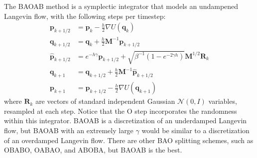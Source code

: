 \documentclass{article}
\begin{document}
      The BAOAB method is a symplectic integrator that models an undampened Langevin flow, with the following steps per timestep: 
      \begin{align*}
        \mathbf{p}_{k + 1/2} & = \mathbf{p}_k - \frac{h}{2} \nabla U(\mathbf{q}_k) \\
        \mathbf{q}_{k + 1/2} & = \mathbf{q}_k + \frac{h}{2} \mathbf{M}^{-1} \mathbf{p}_{k + 1/2} \\
        \mathbf{\hat{p}}_{k + 1/2} & = e^{-h \gamma} \mathbf{p}_{k + 1/2} + \sqrt{\beta^{-1} (1 - e^{-2\gamma h})} \mathbf{M}^{1/2} \mathbf{R}_k \\ 
        \mathbf{q}_{k + 1} & = \mathbf{q}_{k + 1/2} + \frac{h}{2} \mathbf{M}^{-1} \mathbf{\hat{p}}_{k + 1/2} \\
        \mathbf{p}_{k + 1} & = \mathbf{\hat{p}}_{k + 1/2} - \frac{h}{2} \nabla U(\mathbf{q}_{k + 1}) 
      \end{align*}
      where $\mathbf{R}_k$ are vectors of standard independent Gaussian $\mathcal{N}(0, I)$ variables, resampled at each step. Notice that the O step incorporates the randomness within this integrator. 
      BAOAB is a discretization of an underdamped Langevin flow, but BAOAB with an extremely large $\gamma$ would be similar to a discretization of an overdamped Langevin flow. There are other BAO splitting schemes, such as OBABO, OABAO, and ABOBA, but BAOAB is the best. 
\end{document}

